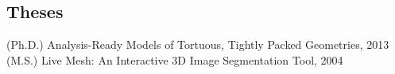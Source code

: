 \documentclass[margin,line]{res}
\begin{document}
\begin{resume}
%
%
%
%
%

%


\section{\sc Theses}
(Ph.D.) Analysis-Ready Models of Tortuous, Tightly Packed Geometries, 2013\\
(M.S.) Live Mesh: An Interactive 3D Image Segmentation Tool, 2004


\end{resume}
\end{document}
